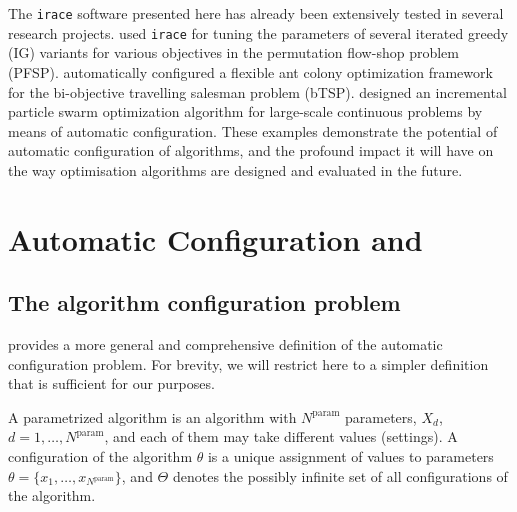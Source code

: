 \documentclass[a4paper]{article}
\newcommand{\irace}{\texttt{irace}\xspace}
\newcommand{\IFRACE}{\text{I/F-Race}\xspace}
\newcommand{\Nparam}{\ensuremath{{N^\text{param}}}\xspace}
\begin{document}
The \irace software presented here has already been extensively tested
in several research projects. \citet{DubLopStu2011cor,IRIDIA-2010-022}
used \irace for tuning the parameters of several iterated greedy (IG)
variants for various objectives in the permutation flow-shop problem
(PFSP). \citet{LopStu2010:ants} automatically configured a flexible
ant colony optimization framework for the bi-objective travelling salesman
problem (bTSP). \citet{MonAydStu2011soco} designed an incremental particle swarm optimization algorithm for large-scale continuous problems by means of automatic configuration.
%
These examples demonstrate the potential of automatic configuration of
algorithms, and the profound impact it will have on the way
optimisation algorithms are designed and evaluated in the future.



\section{Automatic Configuration and \IFRACE}\label{sec:prelim}

\subsection{The algorithm configuration problem}\label{sec:algoconf}

\citet{Birattari09tuning} provides a more general and comprehensive
definition of the automatic configuration problem. For brevity, we
will restrict here to a simpler definition that is sufficient for our
purposes.

A parametrized algorithm is an algorithm with $\Nparam$ parameters, $X_d$,
$d=1,\dotsc,\Nparam$, and each of them may take different values (settings).
A configuration of the algorithm $\theta$ is a unique assignment of
values to parameters $\theta=\{x_1,\dotsc,x_\Nparam\}$, and $\Theta$
denotes the possibly infinite set of all configurations of the
algorithm.
\end{document}
